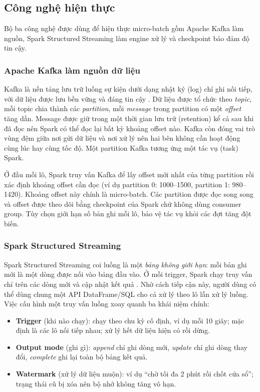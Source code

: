 \subsection{Công nghệ hiện thực}
\label{sec:2-tech}

Bộ ba công nghệ được dùng để hiện thực micro-batch gồm Apache Kafka làm nguồn, Spark Structured Streaming làm engine xử lý và checkpoint bảo đảm độ tin cậy.

\subsubsection{Apache Kafka làm nguồn dữ liệu}
\label{sec:2-kafka}

Kafka là nền tảng lưu trữ luồng sự kiện dưới dạng nhật ký (log) chỉ ghi nối tiếp, với dữ liệu được lưu bền vững và đáng tin cậy \cite{kafka_docs}. Dữ liệu được tổ chức theo \emph{topic}, mỗi topic chia thành các \emph{partition}, mỗi \emph{message} trong partition có một \emph{offset} tăng dần. Message được giữ trong một thời gian lưu trữ (retention) kể cả sau khi đã đọc nên Spark có thể đọc lại bất kỳ khoảng offset nào. Kafka còn đóng vai trò vùng đệm giữa nơi gửi dữ liệu và nơi xử lý nên hai bên không cần hoạt động cùng lúc hay cùng tốc độ. Một partition Kafka tương ứng một tác vụ (task) Spark.

Ở đầu mỗi lô, Spark truy vấn Kafka để lấy offset mới nhất của từng partition rồi xác định khoảng offset cần đọc (ví dụ partition 0: 1000--1500, partition 1: 980--1420). Khoảng offset này chính là micro-batch. Các partition được đọc song song và offset được theo dõi bằng checkpoint của Spark chứ không dùng consumer group. Tùy chọn  giới hạn số bản ghi mỗi lô, bảo vệ tác vụ khỏi các đợt tăng đột biến.

\subsubsection{Spark Structured Streaming}
\label{sec:2-spark}

Spark Structured Streaming coi luồng là một \emph{bảng không giới hạn}: mỗi bản ghi mới là một dòng được nối vào bảng đầu vào. Ở mỗi trigger, Spark chạy truy vấn chỉ trên các dòng mới và cập nhật kết quả \cite{spark_ss}. Nhờ cách tiếp cận này, người dùng có thể dùng chung một API DataFrame/SQL cho cả xử lý theo lô lẫn xử lý luồng. Việc cấu hình một truy vấn luồng xoay quanh ba khái niệm chính:

\begin{itemize}
  \item \textbf{Trigger} (khi nào chạy):  chạy theo chu kỳ cố định, ví dụ mỗi 10 giây; mặc định là các lô nối tiếp nhau;  xử lý hết dữ liệu hiện có rồi dừng.
  \item \textbf{Output mode} (ghi gì): \emph{append} chỉ ghi dòng mới, \emph{update} chỉ ghi dòng thay đổi, \emph{complete} ghi lại toàn bộ bảng kết quả.
  \item \textbf{Watermark} (xử lý dữ liệu muộn): ví dụ ``chờ tối đa 2 phút rồi chốt cửa sổ''; trạng thái cũ bị xóa nên bộ nhớ không tăng vô hạn.
\end{itemize}

